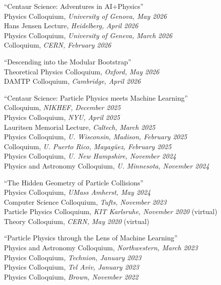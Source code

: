 \bbl

\item ``Centaur Science: Adventures in AI+Physics''
\\ Physics Colloquium, \emph{University of Genova, May 2026}
\\ Hans Jensen Lecture, \emph{Heidelberg, April 2026}
\\ Physics Colloquium, \emph{University of Geneva, March 2026}
\\ Colloquium, \emph{CERN, February 2026}

\item ``Descending into the Modular Bootstrap''
\\ Theoretical Physics Colloquium, \emph{Oxford, May 2026}
\\ DAMTP Colloquium, \emph{Cambridge, April 2026}

\item ``Centaur Science:  Particle Physics meets Machine Learning''
\\ Colloquium, \emph{NIKHEF, December 2025}
\\ Physics Colloquium, \emph{NYU, April 2025}
\\ Lauritsen Memorial Lecture, \emph{Caltech, March 2025}
\\ Physics Colloquium, \emph{U. Wisconsin, Madison, February 2025}
\\ Colloquium, \emph{U. Puerto Rico, Mayagüez, February 2025}
\\ Physics Colloquium, \emph{U. New Hampshire, November 2024}
\\ Physics and Astronomy Colloquium, \emph{U. Minnesota, November 2024}

\item ``The Hidden Geometry of Particle Collisions''
\\ Physics Colloquium, \emph{UMass Amherst, May 2024}
\\ Computer Science Colloquium, \emph{Tufts, November 2023}
\\ Particle Physics Colloquium, \emph{KIT Karlsruhe, November 2020} (virtual)
\\ Theory Colloquium, \emph{CERN, May 2020} (virtual)

\item ``Particle Physics through the Lens of Machine Learning''
\\ Physics and Astronomy Colloquium, \emph{Northwestern, March 2023}
\\ Physics Colloquium, \emph{Technion, January 2023}
\\ Physics Colloquium, \emph{Tel Aviv, January 2023}
\\ Physics Colloquium, \emph{Brown, November 2022}

